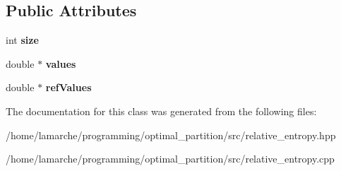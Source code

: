 \subsection*{Public Attributes}
\begin{DoxyCompactItemize}
\item 
\hypertarget{classRelativeEntropy_a684e97eedbf983c173161693dbf89836}{int {\bfseries size}}\label{classRelativeEntropy_a684e97eedbf983c173161693dbf89836}

\item 
\hypertarget{classRelativeEntropy_abf8732d75d92b5e43deafba0b7a4d262}{double $\ast$ {\bfseries values}}\label{classRelativeEntropy_abf8732d75d92b5e43deafba0b7a4d262}

\item 
\hypertarget{classRelativeEntropy_a31d0f68b5478c06f9935e523c34e0df1}{double $\ast$ {\bfseries ref\-Values}}\label{classRelativeEntropy_a31d0f68b5478c06f9935e523c34e0df1}

\end{DoxyCompactItemize}


The documentation for this class was generated from the following files\-:\begin{DoxyCompactItemize}
\item 
/home/lamarche/programming/optimal\-\_\-partition/src/relative\-\_\-entropy.\-hpp\item 
/home/lamarche/programming/optimal\-\_\-partition/src/relative\-\_\-entropy.\-cpp\end{DoxyCompactItemize}
